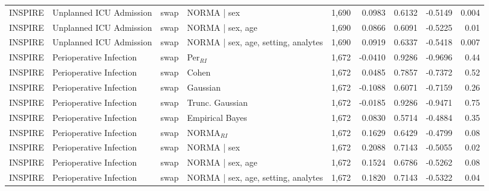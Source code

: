 \begin{table}[ht]
\begin{tabular}{ll l l r r r r r}
INSPIRE & Unplanned ICU Admission & swap & NORMA | sex & 1,690 & 0.0983 & 0.6132 & -0.5149 & 0.004 \\
INSPIRE & Unplanned ICU Admission & swap & NORMA | sex, age & 1,690 & 0.0866 & 0.6091 & -0.5225 & 0.01 \\
INSPIRE & Unplanned ICU Admission & swap & NORMA | sex, age, setting, analytes & 1,690 & 0.0919 & 0.6337 & -0.5418 & 0.007 \\
INSPIRE & Perioperative Infection & swap & Per$_{RI}$ & 1,672 & -0.0410 & 0.9286 & -0.9696 & 0.44 \\
INSPIRE & Perioperative Infection & swap & Cohen & 1,672 & 0.0485 & 0.7857 & -0.7372 & 0.52 \\
INSPIRE & Perioperative Infection & swap & Gaussian & 1,672 & -0.1088 & 0.6071 & -0.7159 & 0.26 \\
INSPIRE & Perioperative Infection & swap & Trunc. Gaussian & 1,672 & -0.0185 & 0.9286 & -0.9471 & 0.75 \\
INSPIRE & Perioperative Infection & swap & Empirical Bayes & 1,672 & 0.0830 & 0.5714 & -0.4884 & 0.35 \\
INSPIRE & Perioperative Infection & swap & NORMA$_{RI}$ & 1,672 & 0.1629 & 0.6429 & -0.4799 & 0.08 \\
INSPIRE & Perioperative Infection & swap & NORMA | sex & 1,672 & 0.2088 & 0.7143 & -0.5055 & 0.02 \\
INSPIRE & Perioperative Infection & swap & NORMA | sex, age & 1,672 & 0.1524 & 0.6786 & -0.5262 & 0.08 \\
INSPIRE & Perioperative Infection & swap & NORMA | sex, age, setting, analytes & 1,672 & 0.1820 & 0.7143 & -0.5322 & 0.04 \\
\bottomrule
\end{tabular}
\label{tab:14_nri}
\end{table}